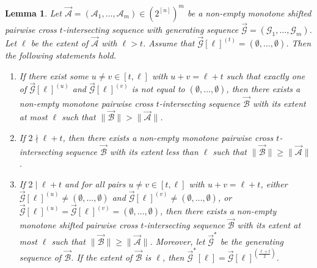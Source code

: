 \documentclass[11pt,a4paper]{article}
\newtheorem{lemma}[theorem]{Lemma}
\begin{document}
\begin{lemma}\label{le22}
  Let $\vec{\mathcal{A}} = (\mathcal{A}_1, \ldots, \mathcal{A}_m) \in (2^{[n]})^{m}$ be  a non-empty monotone shifted pairwise cross $t$-intersecting sequence with  generating sequence  $\vec{\mathcal{G}} = (\mathcal{G}_1, \ldots, \mathcal{G}_m)$. Let $\ell$ be the extent of $\vec{\mathcal{A}}$ with $\ell> t$.
Assume that $\vec{\mathcal{G}}[\ell]^{(t)}=(\emptyset,\ldots,\emptyset)$. Then 
the following statements hold.
\begin{enumerate}
    \item[(1)] If there exist some $u\neq v\in [t,\ell]$ with  $u+v=\ell+t$ such that exactly one of  $\vec{\mathcal{G}}[\ell]^{(u)}$ and $\vec{\mathcal{G}}[\ell]^{(v)}$ is not equal to  $(\emptyset,\ldots, \emptyset)$, then there exists a non-empty monotone pairwise cross $t$-intersecting sequence $\vec{\mathcal{B}}$  with its extent at most $\ell$ such that $\|\vec{\mathcal{B}}\|>\|\vec{\mathcal{A}}\|$.
    
    \item[(2)]  If  $2\nmid \ell+t$, then there exists a non-empty monotone pairwise cross $t$-intersecting sequence $\vec{\mathcal{B}}$  with its extent less than $\ell$  such that $\|\vec{\mathcal{B}}\|\geq \|\vec{\mathcal{A}}\|$.

    
    \item[(3)]   If  $2\mid \ell+t$ and for all pairs $u\neq v\in [t,\ell]$ with  $u+v=\ell+t$,  either $\vec{\mathcal{G}}[\ell]^{(u)}\neq (\emptyset,\ldots, \emptyset)$ and $\vec{\mathcal{G}}[\ell]^{(v)}\neq (\emptyset,\ldots, \emptyset)$, or $\vec{\mathcal{G}}[\ell]^{(u)}=\vec{\mathcal{G}}[\ell]^{(v)}=(\emptyset,\ldots, \emptyset)$, then there exists a non-empty monotone shifted pairwise cross $t$-intersecting sequence $\vec{\mathcal{B}}$  with its extent at most $\ell$  such that $\|\vec{\mathcal{B}}\|\geq \|\vec{\mathcal{A}}\|$. Moreover, let $\vec{\mathcal{G}}^*$ be the generating sequence of $\vec{\mathcal{B}}$.
If the extent of  $\vec{\mathcal{B}}$ is $\ell$, then  $\vec{\mathcal{G}}^*[\ell]= \vec{\mathcal{G}}[\ell]^{(\frac{\ell+t}{2})}$.
\end{enumerate}
\end{lemma}
\end{document}
